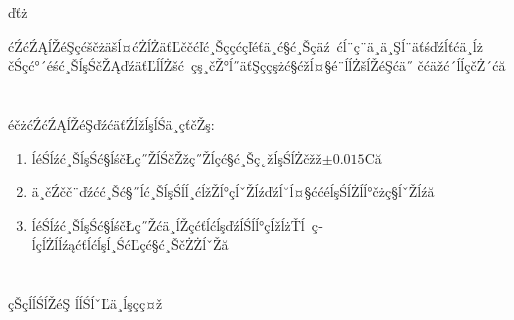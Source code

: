ďťż\documentclass[10.5pt]{article}
\begin{document}
ćŹćŹĄĺŽéŞçćščżäšĺ¤ćŻĺŻäťĽččćľć¸Šçç­ćçľéťä¸ć§ć¸Šçäź ćĺ¨ç¨ä¸ä¸Şĺ¨äťśďźĺťćä¸ĺżčŚçć°´éść¸ŠĺşŚčŽĄďźäťĽĺĺŻšć çş¸čŽ°ĺ˝äťŞççşżć§ćžĺ¤§é¨ĺĺŻšĺŽéŞćä˝
čćäžć´ĺĺçčŻ´ćă

\section{\textbf{}}

éčżćŹćŹĄĺŽéŞďźćäťŹĺžĺşĺŚä¸çťčŽş:
\begin{enumerate}
\item ĺéŚĺźć¸ŠĺşŚć§ĺśčŁç˝ŽĺŚčŽžç˝Žĺçć§ć¸Šç˛žĺşŚĺŻčžž$\pm0.015$\degree Că
\item ä¸čŹčč¨ďźćć¸Šć§˝ĺć¸ŠĺşŚĺĺ¸ćĺžŽĺ°çĺˇŽĺźďźĺ˘ĺ¤§ććéĺşŚĺŻĺĺ°čżç§ĺˇŽĺźă
\item ĺéŚĺźć¸ŠĺşŚć§ĺśčŁç˝Žćä¸ĺŽçćťĺćĺşďźĺŚĺĺ°ç­ĺžĺżŤĺ ç­ĺçĺŻĺĺźąćťĺćĺşĺ¸ŚćĽçć§ć¸ŠčŻŻĺˇŽă
\end{enumerate}

\section{\textbf{}}
\begin{thebibliography}{}
çŠçĺĺ­ŚĺŽéŞ \quad ĺĺ­ŚĺˇĽä¸ĺşçç¤ž
\end{thebibliography}
\end{document}
